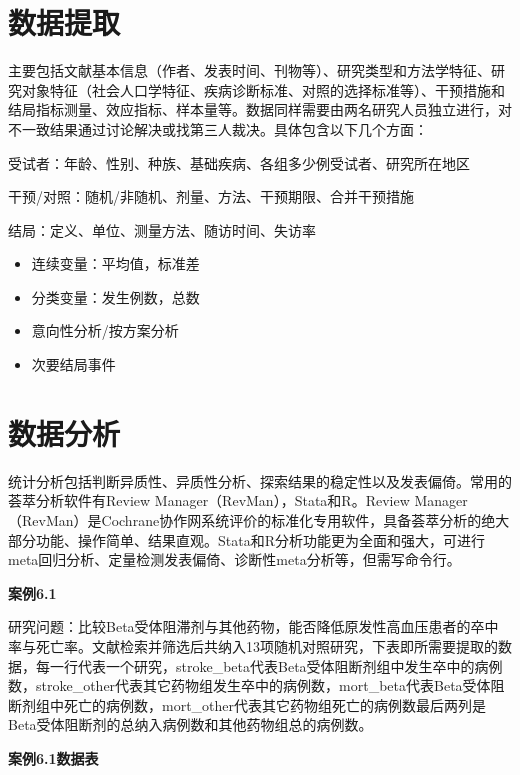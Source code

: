 \documentclass[
  chinese-hans,
  letterpaper,
  DIV=11,
  numbers=noendperiod]{scrreprt}
\begin{document}
\section{数据提取}\label{ux6570ux636eux63d0ux53d6}

主要包括文献基本信息（作者、发表时间、刊物等）、研究类型和方法学特征、研究对象特征（社会人口学特征、疾病诊断标准、对照的选择标准等）、干预措施和结局指标测量、效应指标、样本量等。数据同样需要由两名研究人员独立进行，对不一致结果通过讨论解决或找第三人裁决。具体包含以下几个方面：

受试者：年龄、性别、种族、基础疾病、各组多少例受试者、研究所在地区

干预/对照：随机/非随机、剂量、方法、干预期限、合并干预措施

结局：定义、单位、测量方法、随访时间、失访率

\begin{itemize}
\item
  连续变量：平均值，标准差
\item
  分类变量：发生例数，总数
\item
  意向性分析/按方案分析
\item
  次要结局事件
\end{itemize}

\section{数据分析}\label{ux6570ux636eux5206ux6790}

统计分析包括判断异质性、异质性分析、探索结果的稳定性以及发表偏倚。常用的荟萃分析软件有Review
Manager（RevMan），Stata和R。Review
Manager（RevMan）是Cochrane协作网系统评价的标准化专用软件，具备荟萃分析的绝大部分功能、操作简单、结果直观。Stata和R分析功能更为全面和强大，可进行meta回归分析、定量检测发表偏倚、诊断性meta分析等，但需写命令行。

\textbf{案例6.1}

研究问题：比较Beta受体阻滞剂与其他药物，能否降低原发性高血压患者的卒中率与死亡率。文献检索并筛选后共纳入13项随机对照研究，下表即所需要提取的数据，每一行代表一个研究，stroke\_beta代表Beta受体阻断剂组中发生卒中的病例数，stroke\_other代表其它药物组发生卒中的病例数，mort\_beta代表Beta受体阻断剂组中死亡的病例数，mort\_other代表其它药物组死亡的病例数最后两列是Beta受体阻断剂的总纳入病例数和其他药物组总的病例数。

\textbf{案例6.1数据表}
\end{document}
